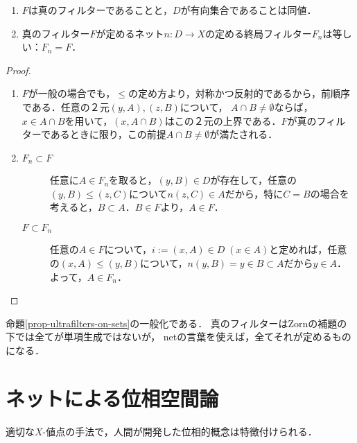 \documentclass[uplatex,dvipdfmx]{jsreport}
\begin{document}
\begin{lemma}\mbox{}
    \begin{enumerate}
        \item $F$は真のフィルターであることと，$D$が有向集合であることは同値．
        \item 真のフィルター$F$が定めるネット$n:D\to X$の定める終局フィルター$F_n$は等しい：$F_n=F$．
    \end{enumerate}
\end{lemma}
\begin{proof}\mbox{}
    \begin{enumerate}
        \item $F$が一般の場合でも，$\le$の定め方より，対称かつ反射的であるから，前順序である．任意の２元$(y,A),(z,B)$について，
        $A\cap B\ne\emptyset$ならば，$x\in A\cap B$を用いて，$(x,A\cap B)$はこの２元の上界である．$F$が真のフィルターであるときに限り，この前提$A\cap B\ne\emptyset$が満たされる．
        \item \begin{description}
            \item[$F_n\subset F$] 任意に$A\in F_n$を取ると，$(y,B)\in D$が存在して，任意の$(y,B)\le (z,C)$について$n(z,C)\in A$だから，特に$C=B$の場合を考えると，$B\subset A$．$B\in F$より，$A\in F$．
            \item[$F\subset F_n$] 任意の$A\in F$について，$i:=(x,A)\in D\;(x\in A)$と定めれば，任意の$(x,A)\le (y,B)$について，$n(y,B)=y\in B\subset A$だから$y\in A$．よって，$A\in F_n$．
        \end{description}
    \end{enumerate}
\end{proof}
\begin{remark}
    命題\ref{prop-ultrafilters-on-sets}の一般化である．
    真のフィルターはZornの補題の下では全てが単項生成ではないが，
    netの言葉を使えば，全てそれが定めるものになる．
\end{remark}

\section{ネットによる位相空間論}

\begin{tcolorbox}[colframe=ForestGreen, colback=ForestGreen!10!white,breakable,colbacktitle=ForestGreen!40!white,coltitle=black,fonttitle=\bfseries\sffamily,
title=]
    適切な$X$-値点の手法で，人間が開発した位相的概念は特徴付けられる．
\end{tcolorbox}
\end{document}
